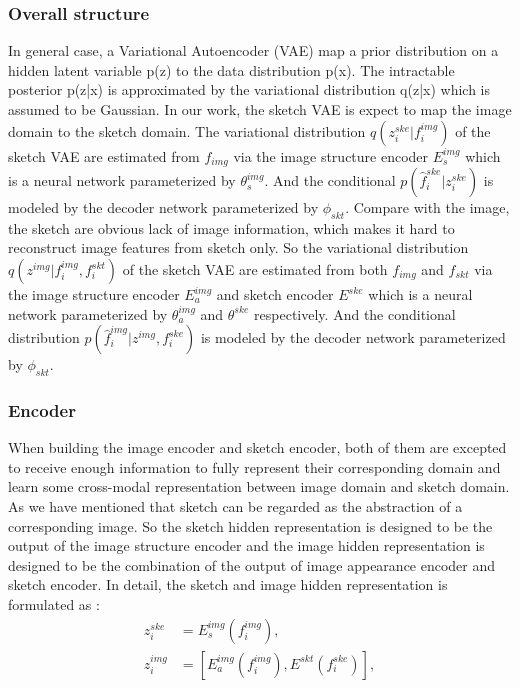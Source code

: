 \documentclass[10pt,twocolumn,letterpaper]{article}
\begin{document}
\subsubsection{Overall structure}
In general case, a Variational Autoencoder (VAE) \cite{kingma2013auto} map a prior distribution on a hidden latent variable p(z) to the data distribution p(x). The intractable posterior p(z|x) is approximated by the variational distribution q(z|x) which is assumed to be Gaussian. 
In our work, the sketch VAE is expect to map the image domain to the sketch domain. 
The variational distribution $q(z_{i}^{ske}|f_{i}^{img})$ of the sketch VAE are estimated from $f_{img}$ via the image structure encoder $E_s^{img}$ which is a neural network parameterized by $\theta_{s}^{img}$. And the conditional $p(\hat{f}_{i}^{ske}|z_{i}^{ske})$ is modeled by the decoder network parameterized by $\phi_{skt}$. 
Compare with the image, the sketch are obvious lack of image information, which makes it hard to reconstruct image features from sketch only. So the variational distribution $q(z^{img}|f_{i}^{img},f_{i}^{skt})$ of the sketch VAE are estimated from both $f_{img}$ and $f_{skt}$ via the image structure encoder $E_a^{img}$ and sketch encoder $E^{ske}$ which is a neural network parameterized by $\theta_{a}^{img}$ and $\theta^{ske}$ respectively. And the conditional distribution $p(\hat{f}_{i}^{img}|z^{img}, f_{i}^{ske})$ is modeled by the decoder network parameterized by $\phi_{skt}$. 

\subsubsection{Encoder}
When building the image encoder and sketch encoder, both of them are excepted to receive enough information to fully represent their corresponding domain and learn some cross-modal representation between image domain and sketch domain. As we have mentioned that sketch can be regarded as the abstraction of a corresponding image.  So the sketch hidden representation is designed to be the output of the image structure encoder and the image hidden representation is designed to be the combination of the output of image appearance encoder and sketch encoder.
In detail, the sketch and image hidden representation is formulated as :
\begin{align}
	z_{i}^{ske} &= E_s^{img}(f_{i}^{img}), \\
	z_{i}^{img} &= [E_a^{img}(f_{i}^{img}), E^{skt}(f_{i}^{ske})],  \\
\end{align}
\end{document}
